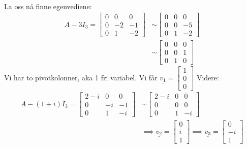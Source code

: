 \documentclass[11pt, a4paper, norsk]{article}
\begin{document}
\begin{Example}{}{}
\begin{align*}
            \end{align*}
            La oss nå finne egenvediene:
            \begin{align*}
                A - 3I_3 = \begin{bmatrix}
                    0 & 0 & 0 \\
                    0 & -2 & -1 \\
                    0 & 1 & -2
                \end{bmatrix} &\sim \begin{bmatrix}
                0 & 0 & 0 \\
                0 & 0 & -5 \\
                0 & 1 & -2
                \end{bmatrix}
                \\
                &\sim \begin{bmatrix}
                    0 & 0 & 0 \\
                    0 & 0 & 1 \\
                    0 & 1 & 0
                \end{bmatrix}
            \end{align*}
            Vi har to pivotkolonner, aka 1 fri variabel. Vi får $\underline{v_1} = \begin{bmatrix}
                1 \\
                0 \\
                0
            \end{bmatrix}$
            Videre:
            \begin{align*}
                A - (1+i)I_3 = \begin{bmatrix}
                    2 - i & 0 & 0 \\
                    0 & -i & -1 \\
                    0 & 1 & -i
                \end{bmatrix} &\sim \begin{bmatrix}
                2-i & 0 & 0 \\
                0 & 0 & 0 \\
                0 & 1 & -i
                \end{bmatrix}
                \\
                &\implies \underline{v_2} = \begin{bmatrix}
                    0 \\
                    i \\
                    1
                \end{bmatrix} \implies \underline{v_3} = \begin{bmatrix}
                    0 \\
                    -i \\
                    1
                \end{bmatrix}
            \end{align*}
        \end{Example}
\end{document}
